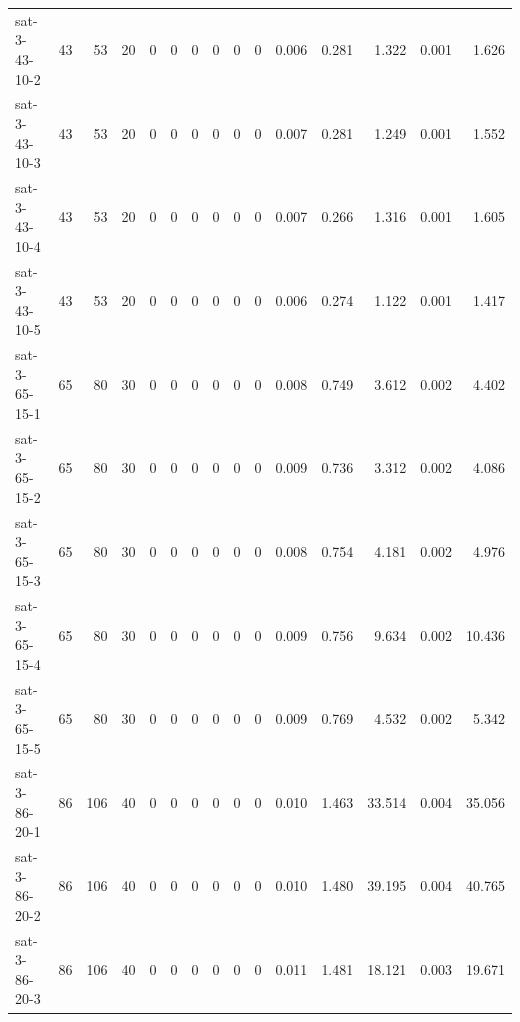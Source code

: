 \begin{table}[H]
{\begin{tabular}{lrrr rr rr rr rrrrr}
            sat-3-43-10-2    & 43                                    & 53              & 20          & 0           & 0            & 0 & 0 & 0 & 0 & 0.006 & 0.281 & 1.322  & 0.001 & 1.626  \\
            sat-3-43-10-3    & 43                                    & 53              & 20          & 0           & 0            & 0 & 0 & 0 & 0 & 0.007 & 0.281 & 1.249  & 0.001 & 1.552  \\
            sat-3-43-10-4    & 43                                    & 53              & 20          & 0           & 0            & 0 & 0 & 0 & 0 & 0.007 & 0.266 & 1.316  & 0.001 & 1.605  \\
            sat-3-43-10-5    & 43                                    & 53              & 20          & 0           & 0            & 0 & 0 & 0 & 0 & 0.006 & 0.274 & 1.122  & 0.001 & 1.417  \\
            sat-3-65-15-1    & 65                                    & 80              & 30          & 0           & 0            & 0 & 0 & 0 & 0 & 0.008 & 0.749 & 3.612  & 0.002 & 4.402  \\
            sat-3-65-15-2    & 65                                    & 80              & 30          & 0           & 0            & 0 & 0 & 0 & 0 & 0.009 & 0.736 & 3.312  & 0.002 & 4.086  \\
            sat-3-65-15-3    & 65                                    & 80              & 30          & 0           & 0            & 0 & 0 & 0 & 0 & 0.008 & 0.754 & 4.181  & 0.002 & 4.976  \\
            sat-3-65-15-4    & 65                                    & 80              & 30          & 0           & 0            & 0 & 0 & 0 & 0 & 0.009 & 0.756 & 9.634  & 0.002 & 10.436 \\
            sat-3-65-15-5    & 65                                    & 80              & 30          & 0           & 0            & 0 & 0 & 0 & 0 & 0.009 & 0.769 & 4.532  & 0.002 & 5.342  \\
            sat-3-86-20-1    & 86                                    & 106             & 40          & 0           & 0            & 0 & 0 & 0 & 0 & 0.010 & 1.463 & 33.514 & 0.004 & 35.056 \\
            sat-3-86-20-2    & 86                                    & 106             & 40          & 0           & 0            & 0 & 0 & 0 & 0 & 0.010 & 1.480 & 39.195 & 0.004 & 40.765 \\
            sat-3-86-20-3    & 86                                    & 106             & 40          & 0           & 0            & 0 & 0 & 0 & 0 & 0.011 & 1.481 & 18.121 & 0.003 & 19.671 \\

\end{tabular}}
\end{table}
